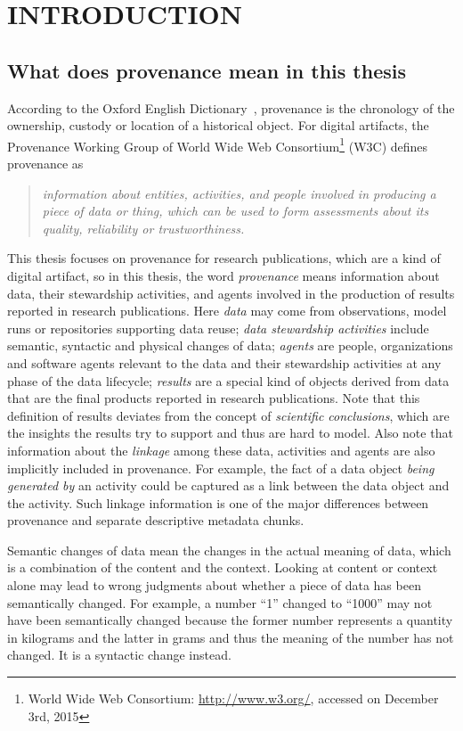 \chapter{INTRODUCTION}
\label{introduction}
\section{What does provenance mean in this thesis}
According to the Oxford English Dictionary~\cite{simpson1989oxford}, provenance is the chronology of the ownership, custody or 
location of a historical object. For digital artifacts, the Provenance Working Group of World Wide 
Web Consortium\footnote{World Wide Web Consortium: \url{http://www.w3.org/}, accessed on December 3rd, 2015} (W3C) defines provenance as \begin{quote}\textit{information about entities, activities, and 
people involved in producing a piece of data or thing, which can be used to form assessments about 
its quality, reliability or trustworthiness.}\end{quote} This thesis focuses on provenance for 
research publications, which are a kind of digital artifact, so in this thesis, the word 
\emph{provenance} means information about data, their stewardship activities, and agents involved in the 
production of results reported in research publications. Here \emph{data} may come from observations, 
model runs or repositories supporting data reuse; \emph{data stewardship activities} include semantic, 
syntactic and physical changes of data; \emph{agents} are people, organizations and software agents 
relevant to the data and their stewardship activities at any phase of the data lifecycle; \emph{results} 
are a special kind of objects derived from data that are the final products reported in research publications. Note that this definition 
of results deviates from the concept of \emph{scientific conclusions}, which are the insights the results try to support and thus are hard to model. Also note that information about the \emph{linkage} among these data, activities and agents are also implicitly included in provenance. For example, the fact of a data object \emph{being generated by} an activity could be captured as a link between the data object and the activity. Such linkage information is one of the major differences between provenance and separate descriptive metadata chunks.

Semantic changes of data mean the changes in the actual meaning of data, which is a combination of the content and the context. Looking at content or context alone may lead to wrong judgments about whether a piece of data has been semantically changed. For example, a number ``1'' changed to ``1000'' may not have been semantically changed because the former number represents a quantity in kilograms and the latter in grams and thus the meaning of the number has not changed. It is a syntactic change instead.

